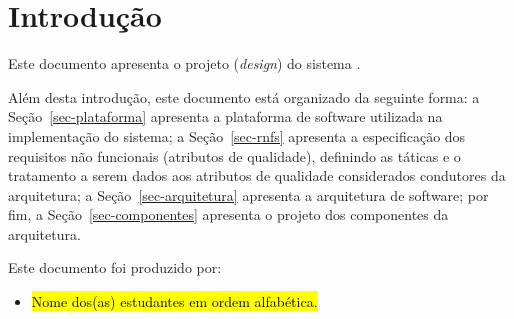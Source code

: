 \chapter{Introdução}
\label{sec-intro}
\vspace{-1cm}

Este documento apresenta o projeto (\textit{design}) do sistema \emph{\imprimirtitulo}. 


Além desta introdução, este documento está organizado da seguinte forma: 
	a Seção~\ref{sec-plataforma} apresenta a plataforma de software utilizada na implementação do sistema;
	a Seção~\ref{sec-rnfs} apresenta a especificação dos requisitos não funcionais (atributos de qualidade), definindo as táticas e o tratamento a serem dados aos atributos de qualidade considerados condutores da arquitetura; 
	a Seção~\ref{sec-arquitetura} apresenta a arquitetura de software; por fim, 
	a Seção~\ref{sec-componentes} apresenta o projeto dos componentes da arquitetura.
	
Este documento foi produzido por:
\begin{itemize}
	\item \hl{Nome dos(as) estudantes em ordem alfabética.}
\end{itemize}

